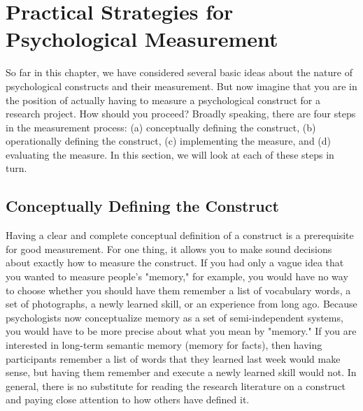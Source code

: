 \newpage
\section{Practical Strategies for Psychological Measurement}



So far in this chapter, we have considered several basic ideas about the nature of psychological constructs and their measurement. But now imagine that you are in the position of actually having to measure a psychological construct for a research project. How should you proceed? Broadly speaking, there are four steps in the measurement process: (a) conceptually defining the construct, (b) operationally defining the construct, (c) implementing the measure, and (d) evaluating the measure. In this section, we will look at each of these steps in turn.

\subsection{Conceptually Defining the Construct}

Having a clear and complete conceptual definition of a construct is a prerequisite for good measurement. For one thing, it allows you to make sound decisions about exactly how to measure the construct. If you had only a vague idea that you wanted to measure people's "memory," for example, you would have no way to choose whether you should have them remember a list of vocabulary words, a set of photographs, a newly learned skill, or an experience from long ago. Because psychologists now conceptualize memory as a set of semi-independent systems, you would have to be more precise about what you mean by "memory." If you are interested in long-term semantic memory (memory for facts), then having participants remember a list of words that they learned last week would make sense, but having them remember and execute a newly learned skill would not. In general, there is no substitute for reading the research literature on a construct and paying close attention to how others have defined it.

